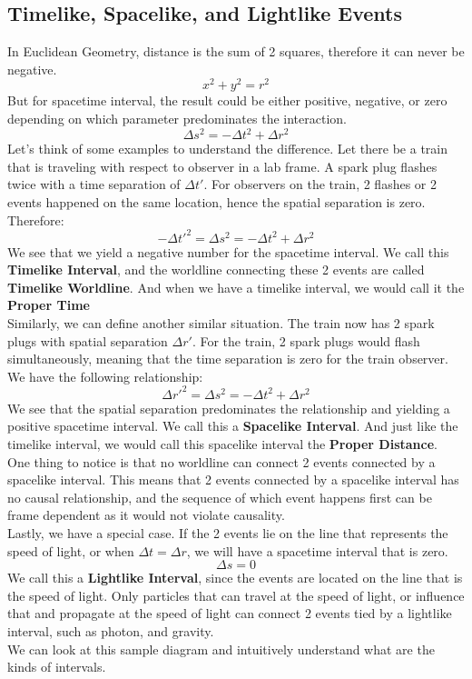 \documentclass[12pt]{book}
\begin{document}
\subsection{Timelike, Spacelike, and Lightlike Events}
In Euclidean Geometry, distance is the sum of 2 squares, therefore it can never be negative.
\[
x^2 + y^2 = r^2
\]
But for spacetime interval, the result could be either positive, negative, or zero depending on which parameter predominates the interaction.
\[
\Delta s^2 = -\Delta t^2 + \Delta r^2
\]
Let's think of some examples to understand the difference. Let there be a train that is traveling with respect to observer in a lab frame. A spark plug flashes twice with a time separation of $\Delta t'$. For observers on the train, 2 flashes or 2 events happened on the same location, hence the spatial separation is zero. Therefore:
\[
-\Delta t'^2 = \Delta s^2 =  -\Delta t^2 + \Delta r^2
\]
We see that we yield a negative number for the spacetime interval. We call this \textbf{Timelike Interval}, and the worldline connecting these 2 events are called \textbf{Timelike Worldline}. And when we have a timelike interval, we would call it the \textbf{Proper Time}\\
\newline
Similarly, we can define another similar situation. The train now has 2 spark plugs with spatial separation $\Delta r'$. For the train, 2 spark plugs would flash simultaneously, meaning that the time separation is zero for the train observer. We have the following relationship:
\[
\Delta r'^2 = \Delta s^2 = -\Delta t^2 + \Delta r^2
\]
We see that the spatial separation predominates the relationship and yielding a positive spacetime interval. We call this a \textbf{Spacelike Interval}. And just like the timelike interval, we would call this spacelike interval the \textbf{Proper Distance}.\\
\newline
One thing to notice is that no worldline can connect 2 events connected by a spacelike interval. This means that 2 events connected by a spacelike interval has no causal relationship, and the sequence of which event happens first can be frame dependent as it would not violate causality.\\
\newline
Lastly, we have a special case. If the 2 events lie on the line that represents the speed of light, or when $\Delta t = \Delta r$, we will have a spacetime interval that is zero.
\[
\Delta s = 0
\]
We call this a \textbf{Lightlike Interval}, since the events are located on the line that is the speed of light. Only particles that can travel at the speed of light, or influence that and propagate at the speed of light can connect 2 events tied by a lightlike interval, such as photon, and gravity. \\
\newline 
We can look at this sample diagram and intuitively understand what are the kinds of intervals. \\
\end{document}
